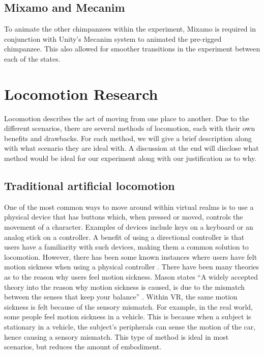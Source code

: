 \documentclass[12pt]{report}
\begin{document}
\subsection{Mixamo and Mecanim}
To animate the other chimpanzees within the experiment, Mixamo is required in conjunction with Unity’s Mecanim system to animated the pre-rigged chimpanzee. This also allowed for smoother transitions in the experiment between each of the states.

\section{Locomotion Research}

Locomotion describes the act of moving from one place to another. Due to the different scenarios, there are several methods of locomotion, each with their own benefits and drawbacks. For each method, we will give a brief description along with what scenario they are ideal with. A discussion at the end will disclose what method would be ideal for our experiment along with our justification as to why. 


\subsection{Traditional artificial locomotion}
One of the most common ways to move around within virtual realms is to use a physical device that has buttons which, when pressed or moved, controls the movement of a character. Examples of devices include keys on a keyboard or an analog stick on a controller. A benefit of using a directional controller is that users have a familiarity with such devices, making them a common solution to locomotion. However, there has been some known instances where users have felt motion sickness when using a physical controller . There have been many theories as to the reason why users feel motion sickness. Mason states “A widely accepted theory into the reason why motion sickness is caused, is due to the mismatch between the senses that keep your balance” . Within VR, the same motion sickness is felt because of the sensory mismatch. For example, in the real world, some people feel motion sickness in a vehicle. This is because when a subject is stationary in a vehicle, the subject’s peripherals can sense the motion of the car, hence causing a sensory mismatch. This type of method is ideal in most scenarios, but reduces the amount of embodiment.
\end{document}
